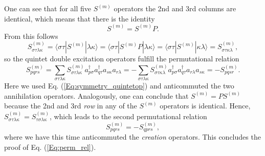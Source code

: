 One can see that for all five ${S^{(m)}}$ operators the 2nd and 3rd columns are identical, which means that there is the identity
	\begin{equation}
	{S^{(m)}} = {S^{(m)}}P.
	\end{equation} 	
From this follows
	\begin{equation}
	\label{Eq:symmetry_quintetop}
	S_{\sigma \tau \lambda \kappa }^{(m)} = \langle \sigma \tau |{S^{(m)}}|\lambda \kappa \rangle  = \langle \sigma \tau |{S^{(m)}}P|\lambda \kappa \rangle  = \langle \sigma \tau |{S^{(m)}}|\kappa \lambda \rangle  = S_{\sigma \tau \kappa \lambda }^{(m)},
	\end{equation} 	
so the quintet double excitation operators fulfill the permutational relation
	\begin{equation}
	S_{pqrs}^{(m)} = \sum\limits_{\sigma \tau \lambda \kappa } {S_{\sigma \tau \lambda \kappa }^{(m)}} a_{p\sigma }^\dag a_{q\tau }^\dag {a_{s\kappa }}{a_{r\lambda }} =  - \sum\limits_{\sigma \tau \lambda \kappa } {S_{\sigma \tau \kappa \lambda }^{(m)}} a_{p\sigma }^\dag a_{q\tau }^\dag {a_{r\lambda }}{a_{s\kappa }} =  - S_{pqsr}^{(m)}.
	\end{equation} 	
Here we used Eq. (\ref{Eq:symmetry_quintetop}) and anticommuted the two annihilation operators. Analogously, one can conclude that ${S^{(m)}} = P{S^{(m)}}$ because the 2nd and 3rd \emph{row} in any of the ${S^{(m)}}$ operators is identical. Hence, $S_{\sigma \tau \lambda \kappa }^{(m)} = S_{\tau \sigma \lambda \kappa }^{(m)}$, which leads to the second permutational relation
	\begin{equation}
	S_{pqrs}^{(m)} =  - S_{qprs}^{(m)},
	\end{equation} 	
where we have this time anticommuted the \emph{creation} operators. This concludes the proof of Eq. (\ref{Eq:perm_rel}).

